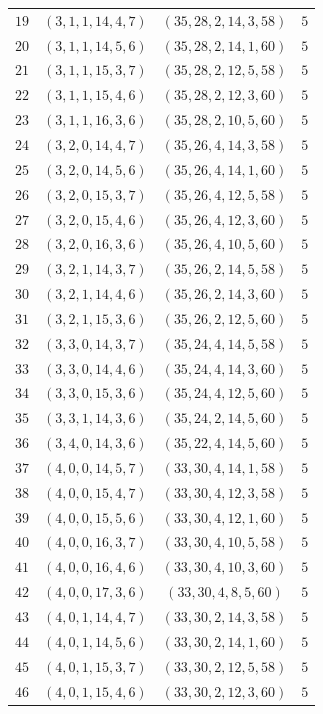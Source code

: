 \documentclass[11pt]{article}
\begin{document}
\begin{longtable}{rccr}
$19$ & $(3,1,1,14,4,7)$ & $(35,28,2,14,3,58)$ & $5$\\
$20$ & $(3,1,1,14,5,6)$ & $(35,28,2,14,1,60)$ & $5$\\
$21$ & $(3,1,1,15,3,7)$ & $(35,28,2,12,5,58)$ & $5$\\
$22$ & $(3,1,1,15,4,6)$ & $(35,28,2,12,3,60)$ & $5$\\
$23$ & $(3,1,1,16,3,6)$ & $(35,28,2,10,5,60)$ & $5$\\
$24$ & $(3,2,0,14,4,7)$ & $(35,26,4,14,3,58)$ & $5$\\
$25$ & $(3,2,0,14,5,6)$ & $(35,26,4,14,1,60)$ & $5$\\
$26$ & $(3,2,0,15,3,7)$ & $(35,26,4,12,5,58)$ & $5$\\
$27$ & $(3,2,0,15,4,6)$ & $(35,26,4,12,3,60)$ & $5$\\
$28$ & $(3,2,0,16,3,6)$ & $(35,26,4,10,5,60)$ & $5$\\
$29$ & $(3,2,1,14,3,7)$ & $(35,26,2,14,5,58)$ & $5$\\
$30$ & $(3,2,1,14,4,6)$ & $(35,26,2,14,3,60)$ & $5$\\
$31$ & $(3,2,1,15,3,6)$ & $(35,26,2,12,5,60)$ & $5$\\
$32$ & $(3,3,0,14,3,7)$ & $(35,24,4,14,5,58)$ & $5$\\
$33$ & $(3,3,0,14,4,6)$ & $(35,24,4,14,3,60)$ & $5$\\
$34$ & $(3,3,0,15,3,6)$ & $(35,24,4,12,5,60)$ & $5$\\
$35$ & $(3,3,1,14,3,6)$ & $(35,24,2,14,5,60)$ & $5$\\
$36$ & $(3,4,0,14,3,6)$ & $(35,22,4,14,5,60)$ & $5$\\
$37$ & $(4,0,0,14,5,7)$ & $(33,30,4,14,1,58)$ & $5$\\
$38$ & $(4,0,0,15,4,7)$ & $(33,30,4,12,3,58)$ & $5$\\
$39$ & $(4,0,0,15,5,6)$ & $(33,30,4,12,1,60)$ & $5$\\
$40$ & $(4,0,0,16,3,7)$ & $(33,30,4,10,5,58)$ & $5$\\
$41$ & $(4,0,0,16,4,6)$ & $(33,30,4,10,3,60)$ & $5$\\
$42$ & $(4,0,0,17,3,6)$ & $(33,30,4,8,5,60)$ & $5$\\
$43$ & $(4,0,1,14,4,7)$ & $(33,30,2,14,3,58)$ & $5$\\
$44$ & $(4,0,1,14,5,6)$ & $(33,30,2,14,1,60)$ & $5$\\
$45$ & $(4,0,1,15,3,7)$ & $(33,30,2,12,5,58)$ & $5$\\
$46$ & $(4,0,1,15,4,6)$ & $(33,30,2,12,3,60)$ & $5$\\

\end{longtable}
\end{document}
